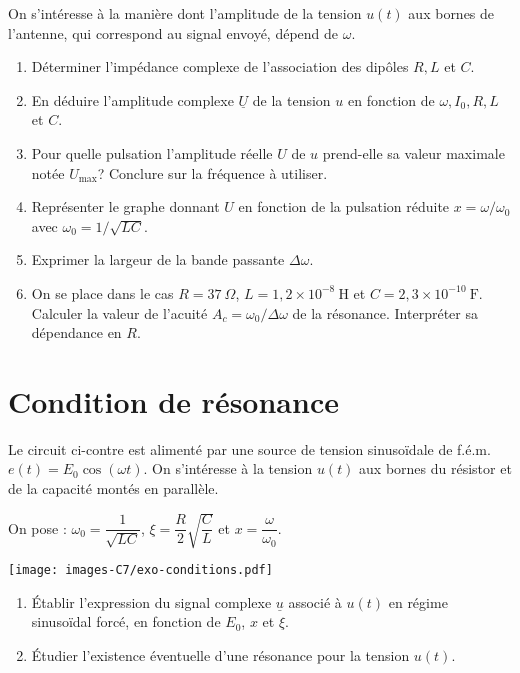 \documentclass[
  10pt,
  a4paper,
  DIV=18]{scrartcl}
\providecommand{\tightlist}{%
  \setlength{\itemsep}{0pt}\setlength{\parskip}{0pt}}
\begin{document}
On s'intéresse à la manière dont l'amplitude de la tension \(u(t)\) aux
bornes de l'antenne, qui correspond au signal envoyé, dépend de
\(\omega\).

\begin{enumerate}
\def\labelenumi{\arabic{enumi}.}
\tightlist
\item
  Déterminer l'impédance complexe de l'association des dipôles \(R,L\)
  et \(C\).
\item
  En déduire l'amplitude complexe \(\underline{U}\) de la tension \(u\)
  en fonction de \(\omega,I_0,R,L\) et \(C\).
\item
  Pour quelle pulsation l'amplitude réelle \(U\) de \(u\) prend-elle sa
  valeur maximale notée \(U_\text{max}\)? Conclure sur la fréquence à
  utiliser.
\item
  Représenter le graphe donnant \(U\) en fonction de la pulsation
  réduite \(x=\omega/\omega_0\) avec \(\omega_0=1/\sqrt{LC}\).
\item
  Exprimer la largeur de la bande passante \(\Delta\omega\).
\item
  On se place dans le cas \(R = 37\ \Omega\),
  \(L = 1,2 \times 10^{-8}\ \mathrm{H}\) et
  \(C = 2,3 \times 10^{-10}\ \mathrm{F}\). Calculer la valeur de
  l'acuité \(A_c = \omega_0/\Delta\omega\) de la résonance. Interpréter
  sa dépendance en \(R\).
\end{enumerate}

\hypertarget{Sec:conditions}{%
\section{Condition de résonance}\label{Sec:conditions}}

\begin{multicols}{2}

Le circuit ci-contre est alimenté par une source de tension sinusoïdale
de f.é.m. \(e(t) = E_0 \cos( \omega t)\). On s'intéresse à la tension
\(u(t)\) aux bornes du résistor et de la capacité montés en parallèle.

On pose : \(\omega_0 =\dfrac{1}{\sqrt{LC}}\),
\(\xi = \dfrac{R}{2}\sqrt{\dfrac{C}{L}}\) et
\(x = \dfrac{\omega}{\omega_0}\).

\begin{center}

\texttt{[image: images-C7/exo-conditions.pdf]}

\end{center}

\end{multicols}

\begin{enumerate}
\def\labelenumi{\arabic{enumi}.}
\tightlist
\item
  Établir l'expression du signal complexe \(\underline{u}\) associé à
  \(u(t)\) en régime sinusoïdal forcé, en fonction de \(E_0\), \(x\) et
  \(\xi\).
\item
  Étudier l'existence éventuelle d'une résonance pour la tension
  \(u(t)\).
\end{enumerate}
\end{document}
